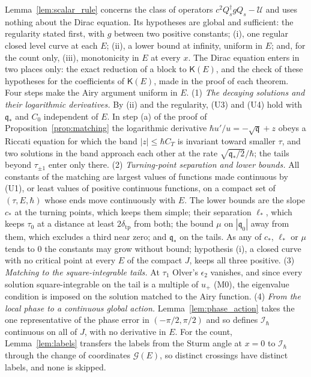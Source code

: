 \documentclass[aps,prd,onecolumn,tightenlines,nofootinbib,notitlepage,11pt,floatfix]{revtex4-2}
\theoremstyle{indentedtheorem}
\begin{document}
\noindent Lemma~\ref{lem:scalar_rule} concerns the class of operators $c^2Q_s^\dagger gQ_s-\mathcal{U}$ and uses nothing about the Dirac equation. Its hypotheses are global and sufficient: the regularity stated first, with $g$ between two positive constants; (i), one regular closed level curve at each $E$; (ii), a lower bound at infinity, uniform in $E$; and, for the count only, (iii), monotonicity in $E$ at every $x$. The Dirac equation enters in two places only: the exact reduction of a block to $\mathsf{K}(E)$, and the check of these hypotheses for the coefficients of $\mathsf{K}(E)$, made in the proof of each theorem. Four steps make the Airy argument uniform in $E$.
(1) \emph{The decaying solutions and their logarithmic derivatives.} By (ii) and the regularity, (U3) and (U4) hold with $\mathfrak{q}_*$ and $C_0$ independent of $E$. In step (a) of the proof of Proposition~\ref{prop:matching} the logarithmic derivative $\hbar u'/u=-\sqrt{\mathfrak{q}}+z$ obeys a Riccati equation for which the band $|z|\leq\hbar C_T$ is invariant toward smaller $\tau$, and two solutions in the band approach each other at the rate $\sqrt{\mathfrak{q}_*/2}/\hbar$; the tails beyond $\tau_{\pm1}$ enter only there.
(2) \emph{Turning-point separation and lower bounds.} All constants of the matching are largest values of functions made continuous by (U1), or least values of positive continuous functions, on a compact set of $(\tau,E,\hbar)$ whose ends move continuously with $E$. The lower bounds are the slope $c_*$ at the turning points, which keeps them simple; their separation $\ell_*$, which keeps $\tau_0$ at a distance at least $2\delta_\text{tp}$ from both; the bound $\mu$ on $|\mathfrak{q}_0|$ away from them, which excludes a third near zero; and $\mathfrak{q}_*$ on the tails. As any of $c_*$, $\ell_*$ or $\mu$ tends to $0$ the constants may grow without bound; hypothesis (i), a closed curve with no critical point at every $E$ of the compact $J$, keeps all three positive.
(3) \emph{Matching to the square-integrable tails.} At $\tau_1$ Olver's $\epsilon_2$ vanishes, and since every solution square-integrable on the tail is a multiple of $u_+$ (M0), the eigenvalue condition is imposed on the solution matched to the Airy function.
(4) \emph{From the local phase to a continuous global action.} Lemma~\ref{lem:phase_action} takes the one representative of the phase error in $(-\pi/2,\pi/2)$ and so defines $\mathcal{I}_\hbar$ continuous on all of $J$, with no derivative in $E$. For the count, Lemma~\ref{lem:labels} transfers the labels from the Sturm angle at $x=0$ to $\mathcal{I}_\hbar$ through the change of coordinates $\mathcal{G}(E)$, so distinct crossings have distinct labels, and none is skipped.
\end{document}
